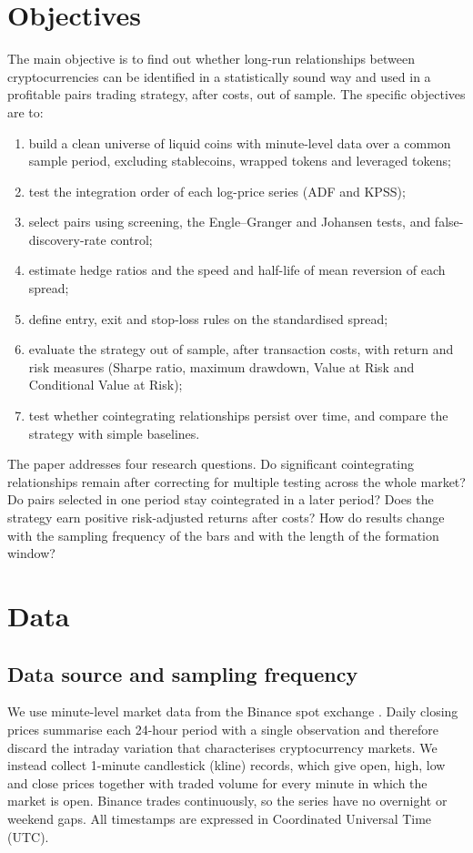 \documentclass[10pt,a4paper,twocolumn]{article}
\begin{document}
	\section{Objectives}
	\label{sec:obj}
	The main objective is to find out whether long-run relationships between cryptocurrencies can be identified in a statistically sound way and used in a profitable pairs trading strategy, after costs, out of sample. The specific objectives are to:
	\begin{enumerate}
		\item build a clean universe of liquid coins with minute-level data over a common sample period, excluding stablecoins, wrapped tokens and leveraged tokens;
		\item test the integration order of each log-price series (ADF and KPSS);
		\item select pairs using screening, the Engle--Granger and Johansen tests, and false-discovery-rate control;
		\item estimate hedge ratios and the speed and half-life of mean reversion of each spread;
		\item define entry, exit and stop-loss rules on the standardised spread;
		\item evaluate the strategy out of sample, after transaction costs, with return and risk measures (Sharpe ratio, maximum drawdown, Value at Risk and Conditional Value at Risk);
		\item test whether cointegrating relationships persist over time, and compare the strategy with simple baselines.
	\end{enumerate}
	
	The paper addresses four research questions. Do significant cointegrating relationships remain after correcting for multiple testing across the whole market? Do pairs selected in one period stay cointegrated in a later period? Does the strategy earn positive risk-adjusted returns after costs? How do results change with the sampling frequency of the bars and with the length of the formation window?
	
	\section{Data}
	\label{sec:data}
	
	\subsection{Data source and sampling frequency}
	We use minute-level market data from the Binance spot exchange \cite{binance}. Daily closing prices summarise each 24-hour period with a single observation and therefore discard the intraday variation that characterises cryptocurrency markets. We instead collect 1-minute candlestick (kline) records, which give open, high, low and close prices together with traded volume for every minute in which the market is open. Binance trades continuously, so the series have no overnight or weekend gaps. All timestamps are expressed in Coordinated Universal Time (UTC).
	
\end{document}
